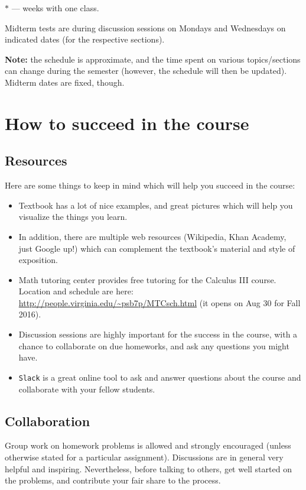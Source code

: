 \documentclass[oneside,11pt]{amsart}
\begin{document}
\vspace{5pt}

$*$ --- weeks with one class. 

Midterm tests are during discussion sessions on Mondays and Wednesdays on indicated dates (for the respective sections).

\textbf{Note:} the schedule is approximate, and the time spent on various topics/sections can change during the semester (however, the schedule will then be updated). Midterm dates are fixed, though.

\section{How to succeed in the course}

\subsection{Resources}

Here are some things to keep in mind which will help you succeed in the course:
\begin{itemize}
	\item Textbook has a lot of nice examples, and great pictures which will help you visualize the things you learn.
	\item In addition, there are multiple web resources (Wikipedia, Khan Academy, just Google up!) which can complement the textbook's material and style of exposition.
	\item Math tutoring center provides free tutoring for the Calculus III course. Location and schedule are here: \url{http://people.virginia.edu/~psb7p/MTCsch.html} (it opens on Aug 30 for Fall 2016).
	\item 
	Discussion sessions are highly important for the success in the course, with a chance to collaborate on due homeworks, and ask any questions you might have.
	\item \texttt{Slack} is a great online tool to ask and answer questions about the course and collaborate with your fellow students.
\end{itemize}

\subsection{Collaboration}

Group work on homework problems is allowed and strongly encouraged (unless otherwise stated for a particular assignment). Discussions are in general very helpful and inspiring. Nevertheless, before talking to others, get well started on the problems, and contribute your fair share to the process. 
\end{document}
